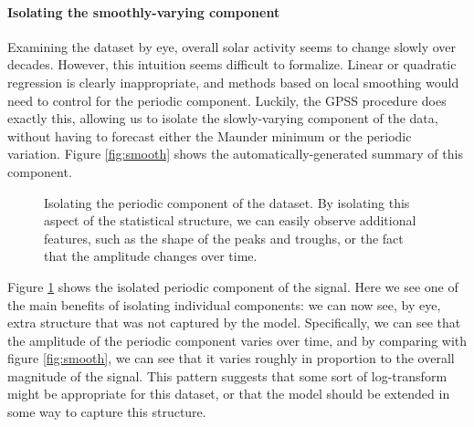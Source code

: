 \documentclass{article} %
\begin{document}
\paragraph{Isolating the smoothly-varying component} Examining the dataset by eye, overall solar activity seems to change slowly over decades.  However, this intuition seems difficult to formalize.  Linear or quadratic regression is clearly inappropriate, and methods based on local smoothing would need to control for the periodic component.  Luckily, the GPSS procedure does exactly this, allowing us to isolate the slowly-varying component of the data, without having to forecast either the Maunder minimum or the periodic variation.  Figure \ref{fig:smooth} shows the automatically-generated summary of this component.

\begin{figure}[h!]
\centering
{}
\caption{Isolating the periodic component of the dataset.  By isolating this aspect of the statistical structure, we can easily observe additional features, such as the shape of the peaks and troughs, or the fact that the amplitude changes over time.}
\label{fig:periodic}
\end{figure}

Figure \ref{fig:periodic} shows the isolated periodic component of the signal.  Here we see one of the main benefits of isolating individual components: we can now see, by eye, extra structure that was not captured by the model.  Specifically, we can see that the amplitude of the periodic component varies over time, and by comparing with figure \ref{fig:smooth}, we can see that it varies roughly in proportion to the overall magnitude of the signal.  This pattern suggests that some sort of log-transform might be appropriate for this dataset, or that the model should be extended in some way to capture this structure.
\end{document}
